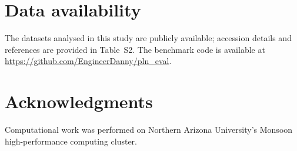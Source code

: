 \documentclass[preprint,12pt,authoryear]{elsarticle}
\begin{document}
\section*{Data availability}
The datasets analysed in this study are publicly available; accession details and references are provided in Table~S2.
The benchmark code is available at \url{https://github.com/EngineerDanny/pln_eval}.

\section*{Acknowledgments}
Computational work was performed on Northern Arizona University's Monsoon high-performance computing cluster.
\end{document}
